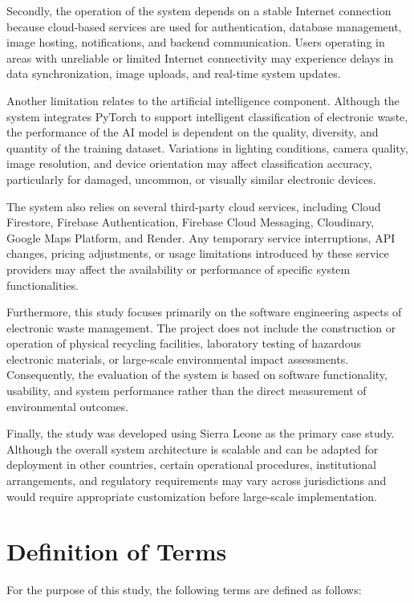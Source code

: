 Secondly, the operation of the system depends on a stable Internet connection
because cloud-based services are used for authentication, database management,
image hosting, notifications, and backend communication. Users operating in areas
with unreliable or limited Internet connectivity may experience delays in data
synchronization, image uploads, and real-time system updates.

Another limitation relates to the artificial intelligence component. Although the
system integrates PyTorch to support intelligent classification of electronic waste, the
performance of the AI model is dependent on the quality, diversity, and quantity of the
training dataset. Variations in lighting conditions, camera quality, image resolution,
and device orientation may affect classification accuracy, particularly for damaged,
uncommon, or visually similar electronic devices.

The system also relies on several third-party cloud services, including Cloud
Firestore, Firebase Authentication, Firebase Cloud Messaging, Cloudinary, Google
Maps Platform, and Render. Any temporary service interruptions, API changes,
pricing adjustments, or usage limitations introduced by these service providers may
affect the availability or performance of specific system functionalities.

Furthermore, this study focuses primarily on the software engineering aspects of
electronic waste management. The project does not include the construction or
operation of physical recycling facilities, laboratory testing of hazardous electronic
materials, or large-scale environmental impact assessments. Consequently, the
evaluation of the system is based on software functionality, usability, and system
performance rather than the direct measurement of environmental outcomes.

Finally, the study was developed using Sierra Leone as the primary case study.
Although the overall system architecture is scalable and can be adapted for
deployment in other countries, certain operational procedures, institutional
arrangements, and regulatory requirements may vary across jurisdictions and would
require appropriate customization before large-scale implementation.

\section{Definition of Terms}
\label{sec:definitions}

For the purpose of this study, the following terms are defined as follows:

